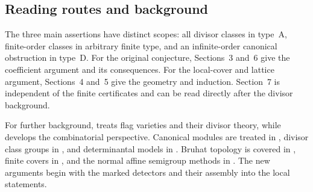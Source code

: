 \subsection{Reading routes and background}
The three main assertions have distinct scopes: all divisor classes in type~A, finite-order classes in arbitrary finite type, and an infinite-order canonical obstruction in type~D. For the original conjecture, Sections~3 and~6 give the coefficient argument and its consequences. For the local-cover and lattice argument, Sections~4 and~5 give the geometry and induction. Section~7 is independent of the finite certificates and can be read directly after the divisor background.

For further background, \cite{Bri05} treats flag varieties and their divisor theory, while \cite{WY23} develops the combinatorial perspective. Canonical modules are treated in \cite{BH93}, divisor class groups in \cite{Har77,Fos73}, and determinantal models in \cite{BV88}. Bruhat topology is covered in \cite{BB05,BW82}, finite covers in \cite{Gro71}, and the normal affine semigroup methods in \cite{CLS11}. The new arguments begin with the marked detectors and their assembly into the local statements.
